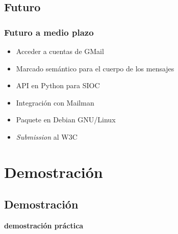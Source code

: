 \documentclass[spanish,notes=hide]{beamer}
\begin{document}
\subsection{Futuro}
\frame
{
  \frametitle{Futuro a medio plazo}
  \begin{itemize}
   \item \begin{Large}Acceder a cuentas de GMail\end{Large}
   \item \begin{Large}Marcado semántico para el cuerpo de los mensajes\end{Large}
   \item \begin{Large}API en Python para SIOC\end{Large}
   \item \begin{Large}Integración con Mailman\end{Large}
   \item \begin{Large}Paquete en Debian GNU/Linux\end{Large}
   \item \begin{Large}\textit{Submission} al W3C\end{Large}
  \end{itemize}
}

\section{Demostración}
\subsection{Demostración}
\frame
{

  \begin{center}
    \LARGE{\textbf{demostración práctica}}
  \end{center}
}
\end{document}
